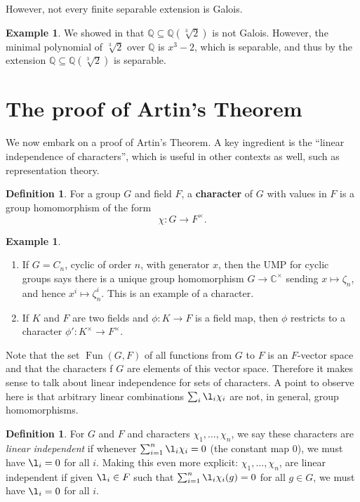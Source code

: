 \documentclass[12pt]{report}
\numberwithin{equation}{section}
\numberwithin{theorem}{chapter}
\theoremstyle{definition}
\newtheorem{definition}[theorem]{Definition}
\newtheorem{example}[theorem]{Example}
\newtheorem*{basic properties}{Basic Properties}
\newtheorem*{Important Remark}{Important Remark}
\newcommand{\df}[1]{{\bf #1}\index{#1}}
\DeclareMathOperator{\Fun}{Fun}
\newcommand{\Q}{\mathbb{Q}}
\newcommand{\C}{\mathbb{C}}
\begin{document}
However, not every finite separable extension is Galois.

\begin{example}
	We showed in  that $\Q \subseteq \Q(\sqrt[3]{2})$ is not Galois. However, the minimal polynomial of $\sqrt[3]{2}$ over $\Q$ is $x^3-2$, which is separable, and thus by  the extension $\Q \subseteq \Q(\sqrt[3]{2})$ is separable.
\end{example}




\section{The proof of Artin's Theorem}

We now embark on a proof of Artin's Theorem. A key ingredient is the ``linear independence of characters'', which is useful in other contexts as well, such as representation theory.

\begin{definition}
For a group $G$ and field $F$, a \df{character} of $G$ with values in $F$ is a group homomorphism of the form
$$\chi: G \to F^\times.$$
\end{definition}



\begin{example}$\,$
\begin{enumerate}[label=\arabic*)]
\item If $G = C_n$, cyclic of order $n$, with generator $x$, then the UMP for cyclic groups says there is a unique group homomorphism  $G \to \C^\times$ sending $x\mapsto \zeta_n$, and hence $x^i \mapsto \zeta_n^i$. This is an example of a character.

\item If $K$ and $F$ are two fields and $\phi: K \to F$ is a field map, then $\phi$ restricts to a character $\phi': K^\times \to F^\times$.
\end{enumerate}
\end{example}


Note that the set $\Fun(G,F)$ of all functions from $G$ to $F$ is an $F$-vector space and that the characters f $G$ are elements of this vector space. Therefore it makes sense to talk about linear independence for sets of characters. A point to observe here is that arbitrary linear combinations  $\sum_i \l_i \chi_i$ are not, in general, group homomorphisms.

\begin{definition}
For $G$ and $F$ and characters $\chi_1, \dots, \chi_n$, we say these
characters are {\em linear independent} if whenever
$\sum_{i=1}^n \l_i \chi_i=0$  (the constant map $0$), we must have $\l_i
= 0$ for all $i$. Making this even more explicit:
$\chi_1, \dots, \chi_n$,
are linear independent if given $\l_i \in F$ such that $\sum_{i=1}^n \l_i
\chi_i(g) = 0$ for all $g \in G$, we must have $\l_i = 0$ for all $i$.
\end{definition}
\end{document}
